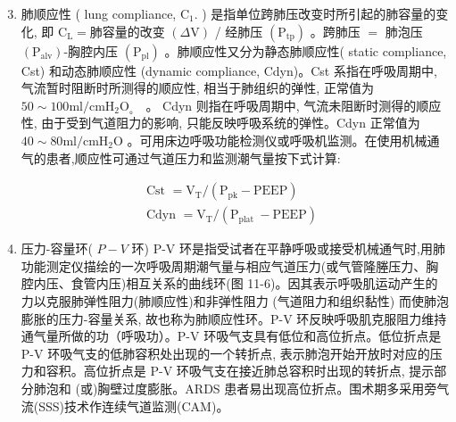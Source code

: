 \documentclass[10pt]{article}
\begin{document}
\begin{enumerate}
  \setcounter{enumi}{2}
  \item 肺顺应性 ( lung compliance, $\mathrm{C}_{1}$. ) 是指单位跨肺压改变时所引起的肺容量的变化, 即 $\mathrm{C}_{\mathrm{L}}=$肺容量的改变 $(\Delta \mathrm{V})$ / 经肺压 $\left(\mathrm{P}_{\mathrm{tp}}\right)$ 。跨肺压 $=$ 肺泡压 $\left(\mathrm{P}_{\mathrm{alv}}\right)$-胸腔内压 $\left(\mathrm{P}_{\mathrm{pl}}\right)$ 。肺顺应性又分为静态肺顺应性( static compliance, Cst) 和动态肺顺应性 (dynamic compliance, Cdyn)。Cst 系指在呼吸周期中, 气流暂时阻断时所测得的顺应性, 相当于肺组织的弹性, 正常值为 $50 \sim 100 \mathrm{ml} / \mathrm{cmH}_{2} \mathrm{O}_{\text {。 }}$ 。 Cdyn 则指在呼吸周期中, 气流未阻断时测得的顺应性, 由于受到气道阻力的影响, 只能反映呼吸系统的弹性。Cdyn 正常值为 $40 \sim 80 \mathrm{ml} / \mathrm{cmH}_{2} \mathrm{O}$ 。可用床边呼吸功能检测仪或呼吸机监测。在使用机械通气的患者,顺应性可通过气道压力和监测潮气量按下式计算:
\end{enumerate}

\[
\begin{aligned}
& \text { Cst }=\mathrm{V}_{\mathrm{T}} /\left(\mathrm{P}_{\mathrm{pk}}-\mathrm{PEEP}\right) \\
& \text { Cdyn }=\mathrm{V}_{\mathrm{T}} /\left(\mathrm{P}_{\text {plat }}-\mathrm{PEEP}\right)
\end{aligned}
\]

\begin{enumerate}
  \setcounter{enumi}{3}
  \item 压力-容量环( $P-V$ 环) P-V 环是指受试者在平静呼吸或接受机械通气时,用肺功能测定仪描绘的一次呼吸周期潮气量与相应气道压力(或气管隆塍压力、胸腔内压、食管内压)相互关系的曲线环(图 11-6)。因其表示呼吸肌运动产生的力以克服肺弹性阻力(肺顺应性)和非弹性阻力 (气道阻力和组织黏性) 而使肺泡膨胀的压力-容量关系, 故也称为肺顺应性环。P-V 环反映呼吸肌克服阻力维持通气量所做的功（呼吸功）。P-V 环吸气支具有低位和高位折点。低位折点是 P-V 环吸气支的低肺容积处出现的一个转折点, 表示肺泡开始开放时对应的压力和容积。高位折点是 P-V 环吸气支在接近肺总容积时出现的转折点, 提示部分肺泡和 (或)胸壁过度膨胀。ARDS 患者易出现高位折点。围术期多采用旁气流(SSS)技术作连续气道监测(CAM)。
\end{enumerate}
\end{document}
